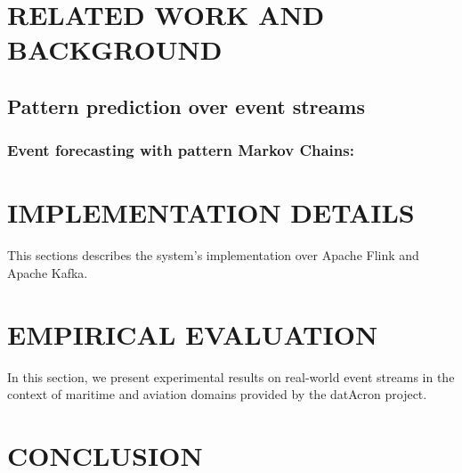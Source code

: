 \section{RELATED WORK AND BACKGROUND}
\subsection{Pattern prediction over event streams}
\subsubsection*{Event forecasting with pattern Markov Chains:}




 
\section{IMPLEMENTATION DETAILS}
This sections describes the system's implementation over Apache Flink and Apache Kafka.

\section{EMPIRICAL EVALUATION}
In this section, we present experimental results on real-world event streams in the context of maritime and aviation domains provided by the datAcron project.

\section{CONCLUSION}